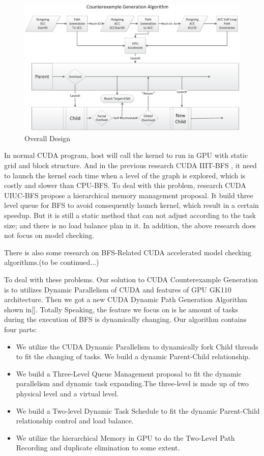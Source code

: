 \documentclass{llncs}
\begin{document}
\begin{figure}[htbp]
	\includegraphics[width=\textwidth]{Overall.eps}
    \caption{Overall Design}
    \label{fig:Overall}
\end{figure}
	
In normal CUDA program, host will call the kernel to run in GPU with static grid and block structure. And in the previous research CUDA IIIT-BFS \cite{}, it need to launch the kernel each time when a level of the graph is explored, which is costly and slower than CPU-BFS. To deal with this problem, research CUDA UIUC-BFS \cite{} propose a hierarchical memory management proposal. It build three level queue for BFS to avoid consequently launch kernel, which result in a certain speedup. But it is still a static method that can not adjust according to the task size; and there is no load balance plan in it. In addition, the above research does not focus on model checking.

There is also some research on BFS-Related CUDA accelerated model checking algorithms.(to be continued...)

To deal with these problems. Our solution to CUDA Counterexample Generation is to utilizes Dynamic Parallelism of CUDA and features of GPU GK110 architecture. Then we got a new CUDA Dynamic Path Generation Algorithm shown in\ref{}. Totally Speaking, the feature we focus on is he amount of tasks during the execution of BFS is dynamically changing. Our algorithm contains four parts:

\begin{itemize}
    \item We utilize the CUDA Dynamic Parallelism to dynamically fork Child threads to fit the changing of tasks. We build a dynamic Parent-Child relationship.
    \item We build a Three-Level Queue Management proposal to fit the dynamic parallelism and dynamic task expanding.The three-level is made up of two physical level and a virtual level.
    \item We build a Two-level Dynamic Task Schedule to fit the dynamic Parent-Child relationship control and load balance.
    \item We utilize the hierarchical Memory in GPU to do the Two-Level Path Recording and duplicate elimination to some extent.
\end{itemize}
\end{document}
